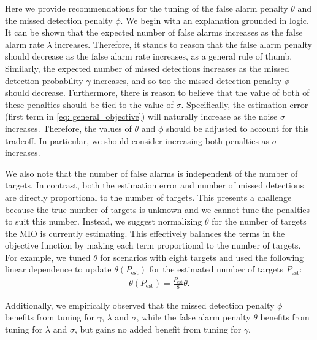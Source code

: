 Here we provide recommendations for the tuning of the false alarm penalty $\theta$ and the missed detection penalty $\phi$. We begin with an explanation grounded in logic. It can be shown that the expected number of false alarms increases as the false alarm rate $\lambda$ increases. Therefore, it stands to reason that the false alarm penalty should decrease as the false alarm rate increases, as a general rule of thumb. Similarly, the expected number of missed detections increases as the missed detection probability $\gamma$ increases, and so too the missed detection penalty $\phi$ should decrease. Furthermore, there is reason to believe that the value of both of these penalties should be tied to the value of $\sigma$. Specifically, the estimation error (first term in \eqref{eq: general_objective}) will naturally increase as the noise $\sigma$ increases. Therefore, the values of $\theta$ and $\phi$ should be adjusted to account for this tradeoff. In particular, we should consider increasing both penalties as $\sigma$ increases. 

We also note that the number of false alarms is independent of the number of targets. In contrast, both the estimation error and number of missed detections are directly proportional to the number of targets. This presents a challenge because the true number of targets is unknown and we cannot tune the penalties to suit this number. Instead, we suggest normalizing $\theta$ for the number of targets the MIO is currently estimating. This effectively balances the terms in the objective function by making each term proportional to the number of targets. For example, we tuned $\theta$ for scenarios with eight targets and used the following linear dependence to update $\theta(P_{\text{est}})$ for the estimated number of targets $P_{\text{est}}$:
\begin{align}
\theta(P_{\text{est}})=\frac{P_{\text{est}}}{8}\theta.
\end{align}

Additionally, we empirically observed that the missed detection penalty $\phi$ benefits from tuning for $\gamma$, $\lambda$ and $\sigma$, while the false alarm penalty $\theta$  benefits from tuning for $\lambda$ and $\sigma$, but gains no added benefit from tuning for $\gamma$.

